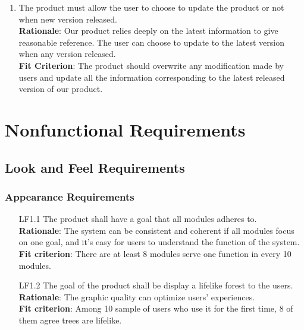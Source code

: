 \documentclass{article}
\begin{document}
\begin{enumerate}[FR1]
	\item The product must allow the user to choose to update the product or not when new version released.\\
	\textbf{Rationale}: Our product relies deeply on the latest information to give reasonable reference. The user can choose to update to the latest version when any version released.\\
	\textbf{Fit Criterion}: The product should overwrite any modification made by users and update all the information corresponding to the latest released version of our product.
	
\end{enumerate}



\section{Nonfunctional Requirements}
\subsection{Look and Feel Requirements}
\subsubsection{Appearance Requirements}
\begin{enumerate}
    \item[LF1.1] The product shall have a goal that all modules adheres to.\\
    \textbf{Rationale}: The system can be consistent and coherent if all modules focus on one goal, and it's easy for users to understand the function of the system.\\
    \textbf{Fit criterion}:  There are at least 8 modules serve one function in every 10 modules.
   
    \item[LF1.2] The goal of the product shall be display a lifelike forest to the users.\\
    \textbf{Rationale}: The graphic quality can optimize users' experiences.\\
    \textbf{Fit criterion}: Among 10 sample of users who use it for the first time, 8 of them agree trees are lifelike.
\end{enumerate}
\end{document}
